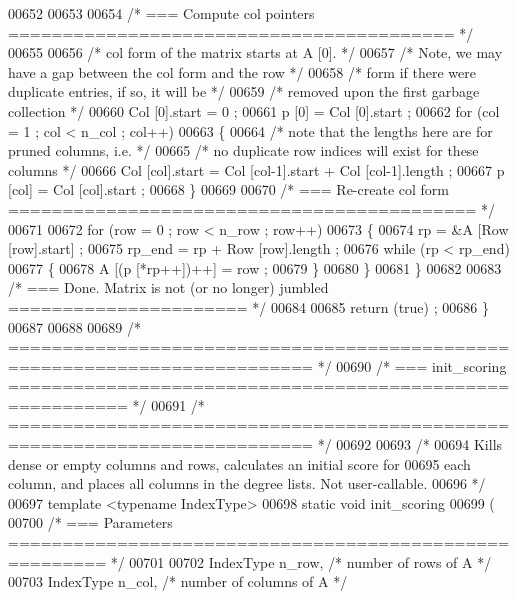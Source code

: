 \begin{DoxyCode}
{{{{{{{{{{00652 
00653 
00654     \textcolor{comment}{/* === Compute col pointers ========================================= */}
00655 
00656     \textcolor{comment}{/* col form of the matrix starts at A [0]. */}
00657     \textcolor{comment}{/* Note, we may have a gap between the col form and the row */}
00658     \textcolor{comment}{/* form if there were duplicate entries, if so, it will be */}
00659     \textcolor{comment}{/* removed upon the first garbage collection */}
00660     Col [0].start = 0 ;
00661     p [0] = Col [0].start ;
00662     \textcolor{keywordflow}{for} (col = 1 ; col < n\_col ; col++)
00663     \{
00664       \textcolor{comment}{/* note that the lengths here are for pruned columns, i.e. */}
00665       \textcolor{comment}{/* no duplicate row indices will exist for these columns */}
00666       Col [col].start = Col [col-1].start + Col [col-1].length ;
00667       p [col] = Col [col].start ;
00668     \}
00669 
00670     \textcolor{comment}{/* === Re-create col form =========================================== */}
00671 
00672     \textcolor{keywordflow}{for} (row = 0 ; row < n\_row ; row++)
00673     \{
00674       rp = &A [Row [row].start] ;
00675       rp\_end = rp + Row [row].length ;
00676       \textcolor{keywordflow}{while} (rp < rp\_end)
00677       \{
00678     A [(p [*rp++])++] = row ;
00679       \}
00680     \}
00681   \}
00682 
00683   \textcolor{comment}{/* === Done.  Matrix is not (or no longer) jumbled ====================== */}
00684 
00685   \textcolor{keywordflow}{return} (\textcolor{keyword}{true}) ;
00686 \}
00687 
00688 
00689 \textcolor{comment}{/* ========================================================================== */}
00690 \textcolor{comment}{/* === init\_scoring ========================================================= */}
00691 \textcolor{comment}{/* ========================================================================== */}
00692 
00693 \textcolor{comment}{/*}
00694 \textcolor{comment}{  Kills dense or empty columns and rows, calculates an initial score for}
00695 \textcolor{comment}{  each column, and places all columns in the degree lists.  Not user-callable.}
00696 \textcolor{comment}{*/}
00697 \textcolor{keyword}{template} <\textcolor{keyword}{typename} IndexType>
00698 \textcolor{keyword}{static} \textcolor{keywordtype}{void} init\_scoring
00699   (
00700     \textcolor{comment}{/* === Parameters ======================================================= */}
00701 
00702     IndexType n\_row,      \textcolor{comment}{/* number of rows of A */}
00703     IndexType n\_col,      \textcolor{comment}{/* number of columns of A */}
}}}}}}}}}}
\end{DoxyCode}
